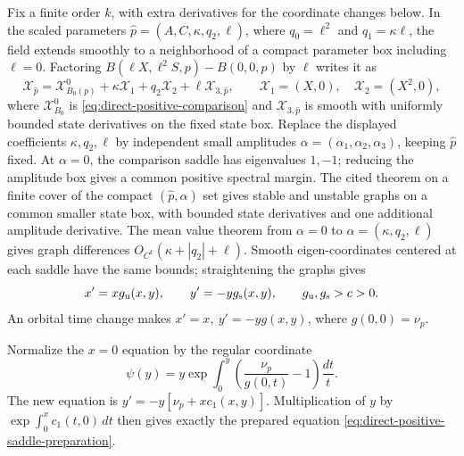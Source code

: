 Fix a finite order \(k\), with extra derivatives for the coordinate
changes below. In the scaled parameters
\(\widehat p=(A,C,\kappa,q_2,\ell)\), where
\(q_0=\ell^2\) and \(q_1=\kappa\ell\), the field extends smoothly
to a neighborhood of a compact parameter box including \(\ell=0\).
Factoring \(B(\ell X,\ell^2S,p)-B(0,0,p)\) by \(\ell\) writes it as
\[
 \mathcal X_{\widehat p}=\mathcal X^0_{B_0(p)}
   +\kappa\mathcal X_1+q_2\mathcal X_2+\ell\mathcal X_{3,\widehat p},
 \qquad \mathcal X_1=(X,0),\quad \mathcal X_2=(X^2,0),
\]
where \(\mathcal X^0_{B_0}\) is \eqref{eq:direct-positive-comparison} and
\(\mathcal X_{3,\widehat p}\) is smooth with uniformly bounded state derivatives on
the fixed state box. Replace the displayed coefficients
\(\kappa,q_2,\ell\) by independent small amplitudes
\(\alpha=(\alpha_1,\alpha_2,\alpha_3)\), keeping \(\widehat p\) fixed.
At \(\alpha=0\), the comparison
saddle has eigenvalues \(1,-1\); reducing the amplitude box gives
a common positive spectral margin. The cited theorem on a finite
cover of the compact \((\widehat p,\alpha)\) set gives stable and unstable
graphs on a common smaller state box, with bounded state derivatives
and one additional amplitude derivative. The mean value theorem from
\(\alpha=0\) to \(\alpha=(\kappa,q_2,\ell)\) gives graph differences
\(O_{C^k}(\kappa+|q_2|+\ell)\). Smooth eigen-coordinates centered
at each saddle have the same bounds; straightening the graphs gives
\[
 x'=xg_{\rm u}(x,y),\qquad y'=-yg_{\rm s}(x,y),\qquad g_{\rm u},g_{\rm s}>c>0.
\]
An orbital time change makes \(x'=x,\ y'=-yg(x,y)\),
where \(g(0,0)=\nu_p\).

Normalize the \(x=0\) equation by the regular coordinate
\[
 \psi(y)=y\exp\int_0^y
           \left(\frac{\nu_p}{g(0,t)}-1\right)\frac{dt}{t}.
\]
The new equation is \(y'=-y[\nu_p+xc_1(x,y)]\).
Multiplication of \(y\) by
\(\exp\int_0^xc_1(t,0)\,dt\) then gives exactly
the prepared equation \eqref{eq:direct-positive-saddle-preparation}.
